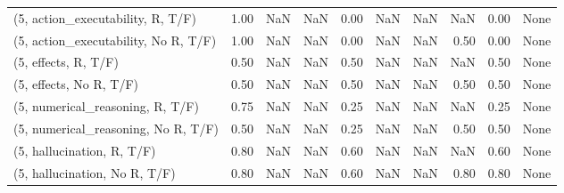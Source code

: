 \begin{table*}[h!]
\begin{adjustbox}{width=2\columnwidth,center}
\begin{tabular}{lrrr|rrr|rrr}
(5, action\_executability, R, T/F)    &                      1.00 &                   NaN &                       NaN &                          0.00 &                       NaN &                           NaN &                                    NaN &                               0.00 &                                  None \\
(5, action\_executability, No R, T/F) &                      1.00 &                   NaN &                       NaN &                          0.00 &                       NaN &                           NaN &                                   0.50 &                               0.00 &                                  None \\
(5, effects, R, T/F)                 &                      0.50 &                   NaN &                       NaN &                          0.50 &                       NaN &                           NaN &                                    NaN &                               0.50 &                                  None \\
(5, effects, No R, T/F)              &                      0.50 &                   NaN &                       NaN &                          0.50 &                       NaN &                           NaN &                                   0.50 &                               0.50 &                                  None \\
(5, numerical\_reasoning, R, T/F)     &                      0.75 &                   NaN &                       NaN &                          0.25 &                       NaN &                           NaN &                                    NaN &                               0.25 &                                  None \\
(5, numerical\_reasoning, No R, T/F)  &                      0.50 &                   NaN &                       NaN &                          0.25 &                       NaN &                           NaN &                                   0.50 &                               0.50 &                                  None \\
(5, hallucination, R, T/F)           &                      0.80 &                   NaN &                       NaN &                          0.60 &                       NaN &                           NaN &                                    NaN &                               0.60 &                                  None \\
(5, hallucination, No R, T/F)        &                      0.80 &                   NaN &                       NaN &                          0.60 &                       NaN &                           NaN &                                   0.80 &                               0.80 &                                  None \\

\end{tabular}
\end{adjustbox}
\end{table*}
